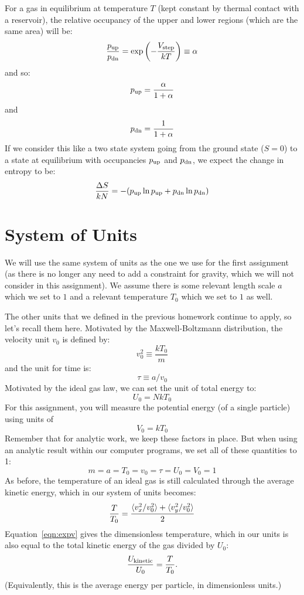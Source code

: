 \documentclass[12pt]{article}
\begin{document}
For a gas in equilibrium at temperature $T$ (kept constant by
thermal contact with a reservoir), the relative occupancy of the upper
and lower regions (which are the same area) will be:
$$\frac{p_{\rm up}}{p_{\rm dn}} = \exp \left( - \frac{V_{\rm step}}{kT} \right) \equiv \alpha $$
and so:
\begin{equation}
p_{\rm up} = \frac{\alpha}{1 + \alpha}
\end{equation}
and
\begin{equation}
p_{\rm dn} = \frac{1}{1 + \alpha}
\end{equation}
If we consider this like a two state system going from the ground state ($S=0$) to a state at equilibrium with occupancies $p_{\rm up}$ and $p_{\rm dn}$, we expect the change in entropy to be:
$$\frac{\Delta S}{kN} = - (p_{\rm up} \ln p_{\rm up} + p_{\rm dn} \ln p_{\rm dn})$$


\section{System of Units}

We will use the same system of units as the one we use for the first
assignment (as there is no longer any need to add a constraint for
gravity, which we will not consider in this assignment).  We assume
there is some relevant length scale $a$ which we set to $1$ and a
relevant temperature $T_0$ which we set to $1$ as well.

The other units that we defined in the previous homework continue to
apply, so let's recall them here.  Motivated by the Maxwell-Boltzmann
distribution, the velocity unit $v_0$ is defined by:
$$ v_0^2 \equiv \frac{k T_0}{m}$$
and the unit for time is:
$$ \tau \equiv a / v_0$$
Motivated by the ideal gas law, we can set the unit of total energy to:
$$U_0 = N k T_0$$
For this assignment, you will measure the potential energy (of a
single particle) using units of
$$V_0 = k T_0$$
Remember that for analytic work, we keep these factors in place.  But when using an
analytic result within our computer programs, we set all of these quantities to 1:
$$m = a = T_0 = v_0 = \tau = U_0 = V_0 = 1$$
As before, the temperature of an ideal gas is still calculated through
the average kinetic energy, which in our system of units becomes:
\begin{equation}
 \label{eqn:expv}
  \frac{T}{T_0} = \frac{\braket{v_x^2/v_0^2} + \braket{v_y^2/v_0^2}}{2}
\end{equation}
Equation~\eqref{eqn:expv} gives the dimensionless temperature, which
in our units is also equal to the total kinetic energy of the gas
divided by $U_0$:
\[
\frac{U_{\rm kinetic}}{U_0} = \frac{T}{T_0}.
\]
(Equivalently, this is the average energy per particle, in dimensionless units.)
\end{document}

